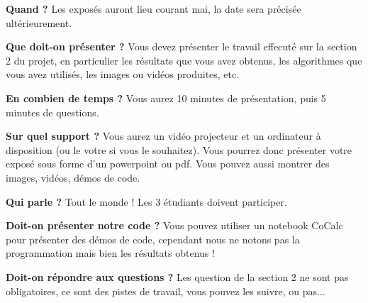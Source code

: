 \smallskip
\textbf{Quand ?} Les exposés auront lieu courant mai, la date sera précisée ultérieurement.

\smallskip
\textbf{Que doit-on présenter ?} Vous devez présenter le travail effecuté sur la section 2 du projet, en particulier les résultats que vous avez obtenus, les algorithmes que vous avez utilisés, les images ou vidéos produites, etc.

\smallskip
\textbf{En combien de temps ?} Vous aurez 10 minutes de présentation, puis 5 minutes de questions.

\smallskip
\textbf{Sur quel support ?} Vous aurez un vidéo projecteur et un ordinateur à disposition (ou le votre si vous le souhaitez). Vous pourrez donc présenter votre exposé sous forme d'un powerpoint ou pdf. Vous pouvez aussi montrer des images, vidéos, démos de code.

\smallskip
\textbf{Qui parle ?} Tout le monde ! Les 3 étudiants doivent participer.

\smallskip
\textbf{Doit-on présenter notre code ?} Vous pouvez utiliser un notebook CoCalc pour présenter des démos de code, cependant nous ne notons pas la programmation mais bien les résultats obtenus !

\smallskip
\textbf{Doit-on répondre aux questions ?} Les question de la section 2 ne sont pas obligatoires, ce sont des pistes de travail, vous pouvez les suivre, ou pas...
